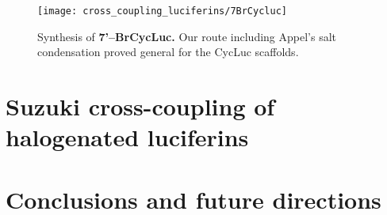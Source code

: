 \begin{figure}[htbp]
\texttt{[image: cross\_coupling\_luciferins/7BrCycluc]} %
\centering
\caption[Synthesis of \textbf{7'--BrCycLuc.}]{
Synthesis of \textbf{7'--BrCycLuc.} Our route including Appel's salt condensation proved general for the CycLuc scaffolds.
}
  \label{fig:7BrCycLuc}
\end{figure}


\section{Suzuki cross-coupling of halogenated luciferins}

\section{Conclusions and future directions}




